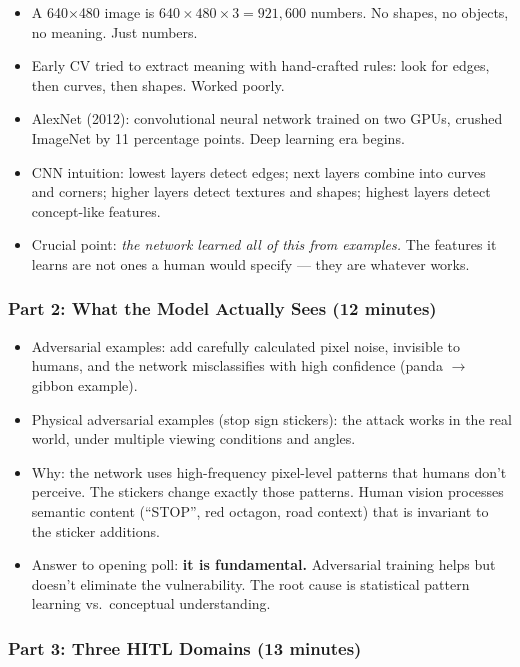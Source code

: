 \begin{itemize}
    \item A 640$\times$480 image is $640 \times 480 \times 3 = 921{,}600$ numbers. No shapes, no objects, no meaning. Just numbers.
    \item Early CV tried to extract meaning with hand-crafted rules: look for edges, then curves, then shapes. Worked poorly.
    \item AlexNet (2012): convolutional neural network trained on two GPUs, crushed ImageNet by 11 percentage points. Deep learning era begins.
    \item CNN intuition: lowest layers detect edges; next layers combine into curves and corners; higher layers detect textures and shapes; highest layers detect concept-like features.
    \item Crucial point: \emph{the network learned all of this from examples.} The features it learns are not ones a human would specify --- they are whatever works.
\end{itemize}

\subsubsection{Part 2: What the Model Actually Sees (12 minutes)}

\begin{itemize}
    \item Adversarial examples: add carefully calculated pixel noise, invisible to humans, and the network misclassifies with high confidence (panda $\to$ gibbon example).
    \item Physical adversarial examples (stop sign stickers): the attack works in the real world, under multiple viewing conditions and angles.
    \item Why: the network uses high-frequency pixel-level patterns that humans don't perceive. The stickers change exactly those patterns. Human vision processes semantic content (``STOP'', red octagon, road context) that is invariant to the sticker additions.
    \item Answer to opening poll: \textbf{it is fundamental.} Adversarial training helps but doesn't eliminate the vulnerability. The root cause is statistical pattern learning vs.\ conceptual understanding.
\end{itemize}

\subsubsection{Part 3: Three HITL Domains (13 minutes)}

